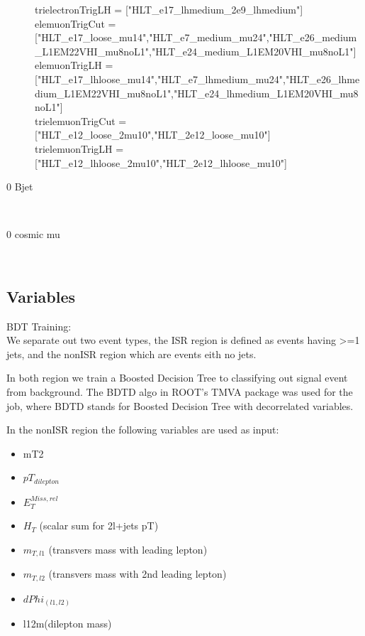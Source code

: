 \begin{description}
trielectronTrigLH = ["HLT\_e17\_lhmedium\_2e9\_lhmedium"]\\

elemuonTrigCut = ["HLT\_e17\_loose\_mu14","HLT\_e7\_medium\_mu24","HLT\_e26\_medium\_L1EM22VHI\_mu8noL1","HLT\_e24\_medium\_L1EM20VHI\_mu8noL1"]\\

elemuonTrigLH = ["HLT\_e17\_lhloose\_mu14","HLT\_e7\_lhmedium\_mu24","HLT\_e26\_lhmedium\_L1EM22VHI\_mu8noL1","HLT\_e24\_lhmedium\_L1EM20VHI\_mu8noL1"]\\

trielemuonTrigCut = ["HLT\_e12\_loose\_2mu10","HLT\_2e12\_loose\_mu10"]\\

trielemuonTrigLH = ["HLT\_e12\_lhloose\_2mu10","HLT\_2e12\_lhloose\_mu10"]\\

\item [0 Bjet]\ \\
\item [0 cosmic mu]\ \\
\end{description}


\subsection{Variables}
BDT Training:\\
We separate out two event types, the ISR region is defined as events having >=1 jets, and the nonISR region which are events eith no jets.

In both region we train a Boosted Decision Tree to classifying out signal event from background. The BDTD algo in ROOT's TMVA package was used for the job, where BDTD stands for Boosted Decision Tree with decorrelated variables. 

In the nonISR region the following variables are used as input:
\begin{itemize}
\item mT2
\item $pT_{dilepton}$
\item $E_{T}^{Miss,rel}$
\item $H_T$ (scalar sum for 2l+jets pT)
\item $m_{T,l1}$ (transvers mass with leading lepton)
\item $m_{T,l2}$ (transvers mass with 2nd leading lepton)
\item $dPhi_{(l1,l2)}$
\item l12m(dilepton mass)

\end{itemize}

